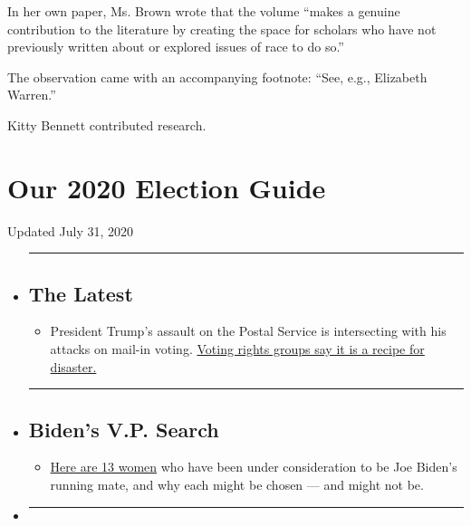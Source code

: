 In her own paper, Ms. Brown wrote that the volume ``makes a genuine
contribution to the literature by creating the space for scholars who
have not previously written about or explored issues of race to do so.''

The observation came with an accompanying footnote: ``See, e.g.,
Elizabeth Warren.''

Kitty Bennett contributed research.

\hypertarget{our-2020-election-guide}{%
\section{Our 2020 Election Guide}\label{our-2020-election-guide}}

Updated July 31, 2020

\begin{itemize}
\item
  \begin{center}\rule{0.5\linewidth}{\linethickness}\end{center}

  \hypertarget{the-latest}{%
  \subsection{The Latest}\label{the-latest}}

  \begin{itemize}
  \tightlist
  \item
    President Trump's assault on the Postal Service is intersecting with
    his attacks on mail-in voting.
    \href{https://www.nytimes.com/2020/07/31/us/politics/trump-usps-mail-delays.html?action=click\&pgtype=Article\&state=default\&region=BELOW_MAIN_CONTENT\&context=storylines_guide}{Voting
    rights groups say it is a recipe for disaster.}
  \end{itemize}
\item
  \begin{center}\rule{0.5\linewidth}{\linethickness}\end{center}

  \hypertarget{bidens-vp-search}{%
  \subsection{Biden's V.P. Search}\label{bidens-vp-search}}

  \begin{itemize}
  \tightlist
  \item
    \href{https://www.nytimes.com/article/biden-vice-president-2020.html?action=click\&pgtype=Article\&state=default\&region=BELOW_MAIN_CONTENT\&context=storylines_guide}{Here
    are 13 women} who have been under consideration to be Joe Biden's
    running mate, and why each might be chosen --- and might not be.
  \end{itemize}
\item
  \begin{center}\rule{0.5\linewidth}{\linethickness}\end{center}


\end{itemize}
